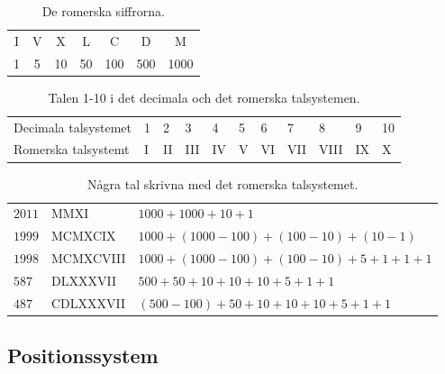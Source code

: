 \documentclass{beamer}
\theoremstyle{definition}
\theoremstyle{remark}
\begin{document}
\begin{frame}{\insertsubsectionhead}
  \begin{table}
    \caption{De romerska siffrorna.}
    \begin{tabular}{ccccccc}
      \toprule
      I & V & X & L & C & D & M \\
      1 & 5 & 10 & 50 & 100 & 500 & 1000 \\
      \bottomrule
    \end{tabular}
    \label{tbl:RomerskaSiffror}
  \end{table}
\end{frame}

\begin{frame}{\insertsubsectionhead}
  \begin{table}
    \caption{Talen 1-10 i det decimala och det romerska talsystemen.}
    \begin{tabular}{l|llllllllll}
      \toprule
      Decimala talsystemet & 1 & 2 & 3 & 4 & 5 & 6 & 7 & 8 & 9 & 10 \\
      Romerska talsystemt & I & II & III & IV & V &
        VI & VII & VIII & IX & X \\
      \bottomrule
    \end{tabular}
    \label{tbl:RomerskaTal}
  \end{table}
\end{frame}

\begin{frame}{\insertsubsectionhead}
  \begin{table}
    \caption{Några tal skrivna med det romerska talsystemet.}
    \small
    \begin{tabular}{lll}
      \toprule
      \(2011\) & MMXI & \(1000+1000+10+1\) \\
      \(1999\) & MCMXCIX & \(1000+(1000-100)+(100-10)+(10-1)\) \\
      \(1998\) & MCMXCVIII & \(1000+(1000-100)+(100-10)+5+1+1+1\) \\
      \(587\) & DLXXXVII & \(500+50+10+10+10+5+1+1\) \\
      \(487\) & CDLXXXVII & \((500-100)+50+10+10+10+5+1+1\) \\
      \bottomrule
    \end{tabular}
    \label{tbl:RomerskaTal2}
  \end{table}
\end{frame}


\subsection{Positionssystem}
\end{document}
